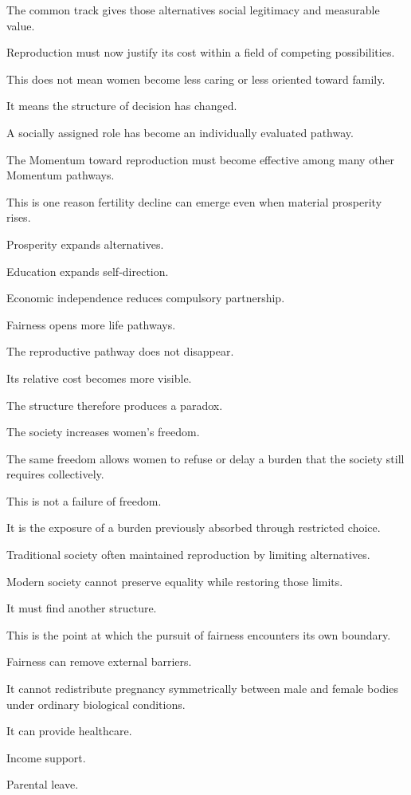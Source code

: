 The common track gives those alternatives social legitimacy and measurable value.

Reproduction must now justify its cost within a field of competing possibilities.

This does not mean women become less caring or less oriented toward family.

It means the structure of decision has changed.

A socially assigned role has become an individually evaluated pathway.

The Momentum toward reproduction must become effective among many other Momentum pathways.

This is one reason fertility decline can emerge even when material prosperity rises.

Prosperity expands alternatives.

Education expands self-direction.

Economic independence reduces compulsory partnership.

Fairness opens more life pathways.

The reproductive pathway does not disappear.

Its relative cost becomes more visible.

The structure therefore produces a paradox.

The society increases women’s freedom.

The same freedom allows women to refuse or delay a burden that the society still requires collectively.

This is not a failure of freedom.

It is the exposure of a burden previously absorbed through restricted choice.

Traditional society often maintained reproduction by limiting alternatives.

Modern society cannot preserve equality while restoring those limits.

It must find another structure.

This is the point at which the pursuit of fairness encounters its own boundary.

Fairness can remove external barriers.

It cannot redistribute pregnancy symmetrically between male and female bodies under ordinary biological conditions.

It can provide healthcare.

Income support.

Parental leave.

